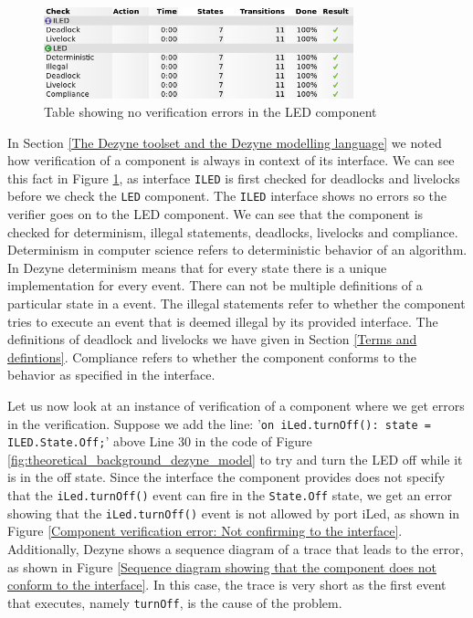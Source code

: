\documentclass[12pt]{scrreprt}
\begin{document}
\begin{figure}
    \centering
    \includegraphics[width=0.8\textwidth]{Figures/theoretical_background/led_verification.png}
    \caption{Table showing no verification errors in the LED component}
    \label{fig:Table showing no verifcation errors in the LED component}
\end{figure}

In Section \ref{The Dezyne toolset and the Dezyne modelling language} we noted how verification of a component is always in context of its interface. We can see this fact in Figure \ref{fig:Table showing no verifcation errors in the LED component}, as interface \texttt{ILED} is first checked for deadlocks and livelocks before we check the \texttt{LED} component. The \texttt{ILED} interface shows no errors so the verifier goes on to the LED component. We can see that the component is checked for determinism, illegal statements, deadlocks, livelocks and compliance. Determinism in computer science refers to deterministic behavior of an algorithm. In Dezyne determinism means that for every state there is a unique implementation for every event. There can not be multiple definitions of a particular state in a event.
The illegal statements refer to whether the component tries to execute an event that is deemed illegal by its provided interface. The definitions of deadlock and livelocks we have given in Section \ref{Terms and defintions}. Compliance refers to whether the component conforms to the behavior as specified in the interface.
\par
Let us now look at an instance of verification of a component where we get errors in the verification. Suppose we add the line: '\texttt{on iLed.turnOff(): state = ILED.State.Off;}' above Line 30 in the code of Figure \ref{fig:theoretical_background_dezyne_model} to try and turn the LED off while it is in the off state. Since the interface the component provides does not specify that the \texttt{iLed.turnOff()} event can fire in the \texttt{State.Off} state, we get an error showing that the \texttt{iLed.turnOff()} event is not allowed by port iLed, as shown in Figure \ref{Component verification error: Not confirming to the interface}. Additionally, Dezyne shows a sequence diagram of a trace that leads to the error, as shown in Figure \ref{Sequence diagram showing that the component does not conform to the interface}. In this case, the trace is very short as the first event that executes, namely \texttt{turnOff}, is the cause of the problem.
\end{document}
